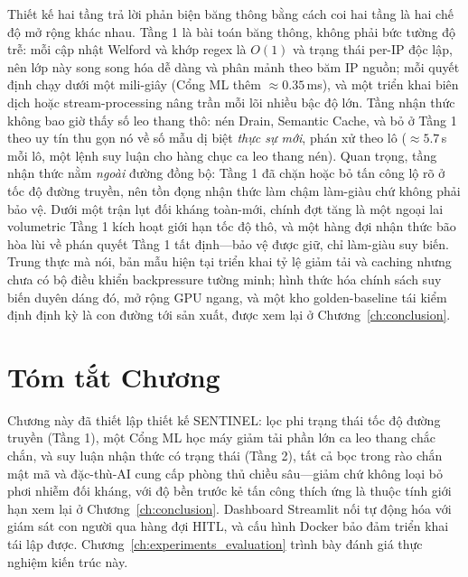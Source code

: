 Thiết kế hai tầng trả lời phản biện băng thông bằng cách coi hai tầng là hai chế độ mở rộng khác nhau. Tầng 1 là bài toán băng thông, không phải bức tường độ trễ: mỗi cập nhật Welford và khớp regex là $O(1)$ và trạng thái per-IP độc lập, nên lớp này song song hóa dễ dàng và phân mảnh theo băm IP nguồn; mỗi quyết định chạy dưới một mili-giây (Cổng ML thêm $\approx\!0.35$\,ms), và một triển khai biên dịch hoặc stream-processing nâng trần mỗi lõi nhiều bậc độ lớn. Tầng nhận thức không bao giờ thấy số leo thang thô: nén Drain, Semantic Cache, và bỏ ở Tầng 1 theo uy tín thu gọn nó về số mẫu dị biệt \emph{thực sự mới}, phán xử theo lô ($\approx\!5.7$\,s mỗi lô, một lệnh suy luận cho hàng chục ca leo thang nén). Quan trọng, tầng nhận thức nằm \emph{ngoài} đường đồng bộ: Tầng 1 đã chặn hoặc bỏ tấn công lộ rõ ở tốc độ đường truyền, nên tồn đọng nhận thức làm chậm làm-giàu chứ không phải bảo vệ. Dưới một trận lụt đối kháng toàn-mới, chính đợt tăng là một ngoại lai volumetric Tầng 1 kích hoạt giới hạn tốc độ thô, và một hàng đợi nhận thức bão hòa lùi về phán quyết Tầng 1 tất định---bảo vệ được giữ, chỉ làm-giàu suy biến. Trung thực mà nói, bản mẫu hiện tại triển khai tỷ lệ giảm tải và caching nhưng chưa có bộ điều khiển backpressure tường minh; hình thức hóa chính sách suy biến duyên dáng đó, mở rộng GPU ngang, và một kho golden-baseline tái kiểm định định kỳ là con đường tới sản xuất, được xem lại ở Chương~\ref{ch:conclusion}.

\section{Tóm tắt Chương}
Chương này đã thiết lập thiết kế SENTINEL: lọc phi trạng thái tốc độ đường truyền (Tầng 1), một Cổng ML học máy giảm tải phần lớn ca leo thang chắc chắn, và suy luận nhận thức có trạng thái (Tầng 2), tất cả bọc trong rào chắn mật mã và đặc-thù-AI cung cấp phòng thủ chiều sâu---giảm chứ không loại bỏ phơi nhiễm đối kháng, với độ bền trước kẻ tấn công thích ứng là thuộc tính giới hạn xem lại ở Chương~\ref{ch:conclusion}. Dashboard Streamlit nối tự động hóa với giám sát con người qua hàng đợi HITL, và cấu hình Docker bảo đảm triển khai tái lập được. Chương~\ref{ch:experiments_evaluation} trình bày đánh giá thực nghiệm kiến trúc này.
